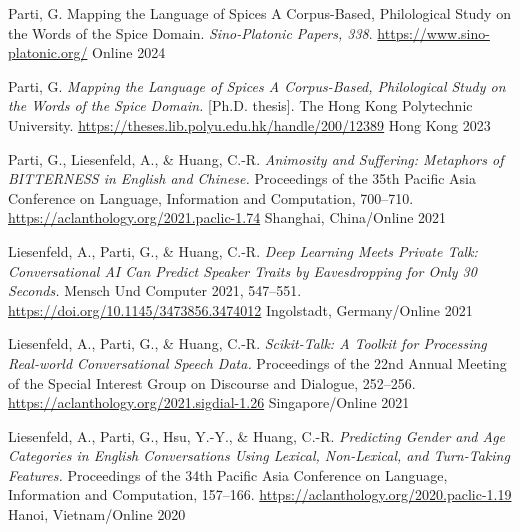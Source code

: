 
\begin{cvhonors}

  \cvhonor
  {Parti, G.} %
  {Mapping the Language of Spices A Corpus-Based, Philological Study on the Words of the Spice Domain. \textit{Sino-Platonic Papers, 338}. \url{https://www.sino-platonic.org/}} %
  {Online} %
  {2024} %

  \cvhonor
  {Parti, G.} %
  {\textit{Mapping the Language of Spices A Corpus-Based, Philological Study on the Words of the Spice Domain.} [Ph.D. thesis]. The Hong Kong Polytechnic University. \url{https://theses.lib.polyu.edu.hk/handle/200/12389}} %
  {Hong Kong} %
  {2023} %

  \cvhonor
  {Parti, G., Liesenfeld, A., \& Huang, C.-R.} %
  {\textit{Animosity and Suffering: Metaphors of BITTERNESS in English and Chinese.} Proceedings of the 35th Pacific Asia Conference on Language, Information and Computation, 700–710. \url{https://aclanthology.org/2021.paclic-1.74}} %
  {Shanghai, China/Online} %
  {2021} %

  \cvhonor
  {Liesenfeld, A., Parti, G., \& Huang, C.-R.} %
  {\textit{Deep Learning Meets Private Talk: Conversational AI Can Predict Speaker Traits by Eavesdropping for Only 30 Seconds.} Mensch Und Computer 2021, 547–551. \url{https://doi.org/10.1145/3473856.3474012}} %
  {Ingolstadt, Germany/Online} %
  {2021} %

  \cvhonor
  {Liesenfeld, A., Parti, G., \& Huang, C.-R.} %
  {\textit{Scikit-Talk: A Toolkit for Processing Real-world Conversational Speech Data.} Proceedings of the 22nd Annual Meeting of the Special Interest Group on Discourse and Dialogue, 252–256. \url{https://aclanthology.org/2021.sigdial-1.26}} %
  {Singapore/Online} %
  {2021} %

\cvhonor
  {Liesenfeld, A., Parti, G., Hsu, Y.-Y., \& Huang, C.-R.} %
  {\textit{Predicting Gender and Age Categories in English Conversations Using Lexical, Non-Lexical, and Turn-Taking Features.} Proceedings of the 34th Pacific Asia Conference on Language, Information and Computation, 157–166. \url{https://aclanthology.org/2020.paclic-1.19}} %
  {Hanoi, Vietnam/Online} %
  {2020} %


\end{cvhonors}
